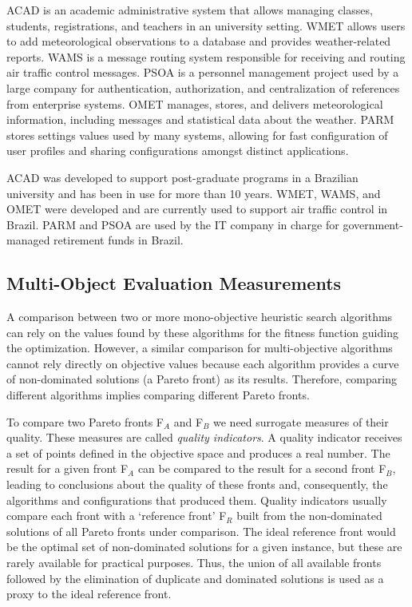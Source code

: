 \documentclass[conference]{IEEEtran}
\begin{document}
ACAD is an academic administrative system that allows managing classes, students, registrations, and teachers in an university setting. WMET allows users to add meteorological observations to a database and provides weather-related reports. WAMS is a message routing system responsible for receiving and routing air traffic control messages. PSOA is a personnel management project used by a large company for authentication, authorization, and centralization of references from enterprise systems. OMET manages, stores, and delivers meteorological information, including messages and statistical data about the weather. PARM stores settings values used by many systems, allowing for fast configuration of user profiles and sharing configurations amongst distinct applications. 

ACAD was developed to support post-graduate programs in a Brazilian university and has been in use for more than 10 years. WMET, WAMS, and OMET were developed and are currently used to support air traffic control in Brazil. PARM and PSOA are used by the IT company in charge for government-managed retirement funds in Brazil.	

\subsection{Multi-Object Evaluation Measurements}
A comparison between two or more mono-objective heuristic search algorithms can rely on the values found by these algorithms for the fitness function guiding the optimization. However, a similar comparison for multi-objective algorithms cannot rely directly on objective values because each algorithm provides a curve of non-dominated solutions (a Pareto front) as its results. Therefore, comparing different algorithms implies comparing different Pareto fronts. 

To compare two Pareto fronts F$_{A}$ and F$_{B}$ we need surrogate measures of their quality. These measures are called {\it quality indicators}. A quality indicator receives a set of points defined in the objective space and produces a real number. The result for a given front F$_{A}$ can be compared to the result for a second front F$_{B}$, leading to conclusions about the quality of these fronts and, consequently, the algorithms and configurations that produced them. Quality indicators usually compare each front with a `reference front' F$_{R}$ built from the non-dominated solutions of all Pareto fronts under comparison. The ideal reference front would be the optimal set of non-dominated solutions for a given instance, but these are rarely available for practical purposes. Thus, the union of all available fronts followed by the elimination of duplicate and dominated solutions is used as a proxy to the ideal reference front. 
\end{document}
